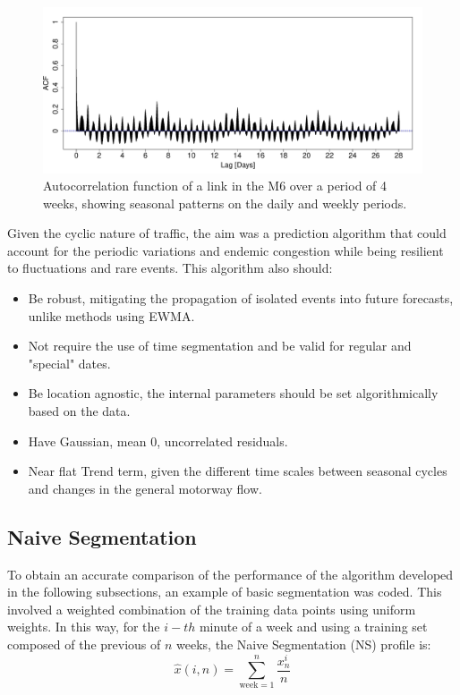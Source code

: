 \documentclass[letterpaper, 10 pt, conference]{ieeeconf}  %
\begin{document}
\begin{figure}[htbp]
	\centerline{\includegraphics[width=\linewidth]{./images/finalplots/ACF_M6_Link3.pdf}}
	\caption{Autocorrelation function of a link in the M6 over a period of 4 weeks, showing seasonal patterns on the daily and weekly periods.}
	\label{fig:acf}
\end{figure}

Given the cyclic nature of traffic, the aim was a prediction algorithm that could account for the periodic variations and endemic congestion while being resilient to fluctuations and rare events. This algorithm also should:
\begin{itemize}
	\item Be robust, mitigating the propagation of isolated events into future forecasts, unlike methods using EWMA.
	\item Not require the use of time segmentation and be valid for regular and "special" dates.
	\item Be location agnostic, the internal parameters should be set algorithmically based on the data.
	\item Have Gaussian, mean 0, uncorrelated residuals.
	\item Near flat Trend term, given the different time scales between seasonal cycles and changes in the general motorway flow.
\end{itemize}

\subsection{Naive Segmentation}
To obtain an accurate comparison of the performance of the algorithm developed in the following subsections, an example of basic segmentation was coded. 
This involved a weighted combination of the training data points using uniform weights. 
In this way, for the $i-th$ minute of a week and using a training set composed of the previous of $n$ weeks, the Naive Segmentation (NS) profile is:
\begin{equation}
\hat{x}(i,n) = \sum_{\textrm{week}=1}^{n} \frac{x^i_n}{n} 
\end{equation}
\end{document}

